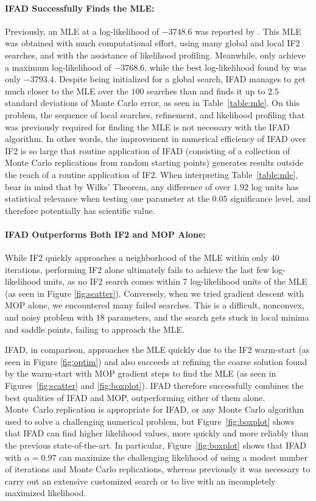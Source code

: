 \documentclass[9pt,twocolumn,pnasresearcharticle]{pnas-new}
\begin{document}
\paragraph{IFAD Successfully Finds the MLE:} Previously, an MLE at a log-likelihood of $-3748.6$ was reported by \cite{king16}.
This MLE was obtained with much computational effort, using many global and local IF2 searches, and with the assistance of likelihood profiling.
Meanwhile, \cite{ionides15} only achieve a maximum log-likelihood of $-3768.6$, while the best log-likelihood found by \cite{king08} was only $-3793.4$.
Despite being initialized for a global search, IFAD manages to get much closer to the MLE over the $100$ searches than \cite{ionides15} and finds it up to $2.5$ standard deviations of Monte Carlo error, as seen in Table~\ref{table:mle}.
On this problem, the sequence of local searches, refinement, and likelihood profiling that was previously required for finding the MLE is not necessary with the IFAD algorithm. 
In other words, the improvement in numerical efficiency of IFAD over IF2 is so large that routine application of IFAD (consisting of a collection of Monte Carlo replications from random starting points) generates results outside the reach of a routine application of IF2. 
When interpreting Table~\ref{table:mle}, bear in mind that by Wilks' Theorem, any difference of over $1.92$ log units has statistical relevance when testing one parameter at the $0.05$ significance level, and therefore potentially has scientific value.

\paragraph{IFAD Outperforms Both IF2 and MOP Alone:} While IF2 quickly approaches a neighborhood of the MLE within only 40 iterations, performing IF2 alone ultimately fails to achieve the last few log-likelihood units, as no IF2 search comes within 7 log-likelihood units of the MLE (as seen in Figure \ref{fig:scatter}). Conversely, when we tried gradient descent with MOP alone, we encountered many failed searches. This is a difficult, nonconvex, and noisy problem with $18$ parameters, and the search gets stuck in local minima and saddle points, failing to approach the MLE. 

IFAD, in comparison, approaches the MLE quickly due to the IF2 warm-start (as seen in Figure \ref{fig:optim}) and also succeeds at refining the coarse solution found by the warm-start with MOP gradient steps to find the MLE (as seen in Figures~\ref{fig:scatter} and \ref{fig:boxplot}). IFAD therefore successfully combines the best qualities of IFAD and MOP, outperforming either of them alone.
Monte~Carlo replication is appropriate for IFAD, or any Monte Carlo algorithm used to solve a challenging numerical problem, but Figure~\ref{fig:boxplot} shows that IFAD can find higher likelihood values, more quickly and more reliably than the previous state-of-the-art. 
In particular, Figure~\ref{fig:boxplot} shows that IFAD with $\alpha=0.97$ can maximize the challenging likelihood of \cite{king08} using a modest number of iterations and Monte Carlo replications, whereas previously it was necessary to carry out an extensive customized search or to live with an incompletely maximized likelihood.
\end{document}
